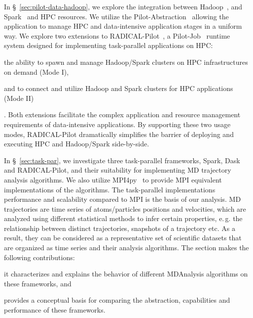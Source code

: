 \label{ch:data_hpc}


In \S~\ref{sec:pilot-data-hadoop}, we explore the integration between Hadoop~\cite{hadoop}, and Spark~\cite{zaharia2010spark} and HPC resources.
We utilize the Pilot-Abstraction~\cite{luckow2012pstar} allowing the application to manage HPC and data-intensive application stages in a uniform way.
We explore two extensions to RADICAL-Pilot~\cite{merzky2018design}, a Pilot-Job~\cite{luckow2012pstar} runtime system designed for implementing task-parallel applications on HPC: 
\begin{inparaenum}[(i)]
    \item the ability to spawn and manage Hadoop/Spark clusters on HPC infrastructures on demand (Mode I),
    \item and to connect and utilize Hadoop and Spark clusters for HPC applications (Mode II)
\end{inparaenum}.
Both extensions facilitate the complex application and resource management requirements of data-intensive applications.
By supporting these two usage modes, RADICAL-Pilot dramatically simplifies the barrier of deploying and executing HPC and Hadoop/Spark side-by-side.

In \S~\ref{sec:task-par}, we investigate three task-parallel frameworks, Spark, Dask and RADICAL-Pilot, and their suitability for implementing MD trajectory analysis algorithms.
We also utilize MPI4py~\cite{dalcin2005mpi} to provide MPI equivalent implementations of the algorithms.
The task-parallel implementations performance and scalability compared to MPI is the basis of our analysis.
MD trajectories are time series of atoms/particles positions and velocities, which are analyzed using different statistical methods to infer certain properties, e.\,g. the relationship between distinct trajectories, snapshots of a trajectory etc.
As a result, they can be considered as a representative set of scientific datasets that are organized as time series and their analysis algorithms. 
The section makes the following contributions: 
\begin{inparaenum}[i)]
    \item it characterizes and explains the behavior of different MDAnalysis algorithms on these frameworks, and
    \item provides a conceptual basis for comparing the abstraction, capabilities and performance of these frameworks.
\end{inparaenum}


